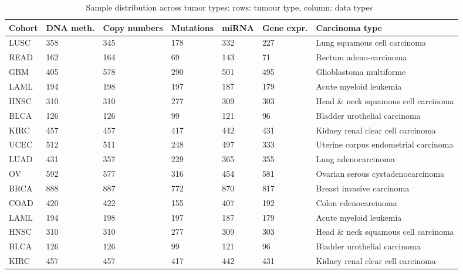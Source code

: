\begin{table} [h]
\centering
    \scriptsize
    \caption{Sample distribution across tumor types: rows: tumour type, column: data types~\cite{weinstein2013cancer}}
    \label{table:alldatadetails2}
    \vspace{-2mm}
    \begin{tabular}{l|l|l|l|l|l|l}
        \hline
        \rowcolor{Gray}
         \textbf{Cohort} & \textbf{DNA meth.} & \textbf{Copy numbers} & \textbf{Mutations} & \textbf{miRNA} & \textbf{Gene expr.} & \textbf{Carcinoma type} \\\hline
            LUSC & 358 & 345 & 178 & 332 & 227 & Lung squamous cell carcinoma \\\hline
            READ & 162 & 164 & 69 & 143 & 71 & Rectum adeno-carcinoma \\\hline%
            GBM  & 405 & 578 & 290 & 501 & 495 & Glioblastoma multiforme \\\hline
            LAML & 194 & 198 & 197 & 187 & 179 & Acute myeloid leukemia	\\\hline%
            HNSC & 310 & 310 & 277 & 309 & 303 & Head \& neck squamous cell carcinoma \\\hline 
            BLCA & 126 & 126 & 99 & 121 & 96 & Bladder urothelial carcinoma \\\hline 
            KIRC & 457 & 457 & 417 & 442 & 431 & Kidney renal clear cell carcinoma  \\\hline
            UCEC & 512 & 511 & 248 & 497 & 333 & Uterine corpus endometrial carcinoma \\\hline
            LUAD & 431 & 357 & 229 & 365 & 355 & Lung adenocarcinoma \\\hline
            OV   & 592 & 577 & 316 & 454 & 581 & Ovarian serous cystadenocarcinoma \\\hline
            BRCA & 888 & 887 & 772 & 870 & 817 & Breast invasive carcinoma  \\\hline
            COAD & 420 & 422 & 155 & 407 & 192 & Colon cdenocarcinoma \\\hline
            LAML & 194 & 198 & 197 & 187 & 179 & Acute myeloid leukemia	\\\hline%
            HNSC & 310 & 310 & 277 & 309 & 303 & Head \& neck squamous cell carcinoma \\\hline 
            BLCA & 126 & 126 & 99 & 121 & 96 & Bladder urothelial carcinoma \\\hline 
            KIRC & 457 & 457 & 417 & 442 & 431 & Kidney renal clear cell carcinoma  \\\hline

\end{tabular}
\end{table}
